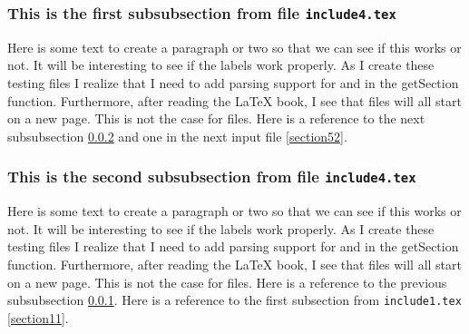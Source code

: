 \subsubsection{This is the first subsubsection from file \texttt{include4.tex}}
\label{section41}

Here is some text to create a paragraph or two so that we
can see if this works or not.  It will be interesting to see
if the labels work properly.  As I create these testing files
I realize that I need to add parsing support for \verb##
and \verb## in the getSection function.   Furthermore,
after reading the \LaTeX{} book, I see that \verb## 
files will all start on a new page.  This is not the case for
\verb## files.  Here is a reference to the next subsubsection \ref{section42} 
and one in the next input file \ref{section52}.

\subsubsection{This is the second subsubsection from file \texttt{include4.tex}}
\label{section42}

Here is some text to create a paragraph or two so that we
can see if this works or not.  It will be interesting to see
if the labels work properly.  As I create these testing files
I realize that I need to add parsing support for \verb##
and \verb## in the getSection function.   Furthermore,
after reading the \LaTeX{} book, I see that \verb## 
files will all start on a new page.  This is not the case for
\verb## files.  Here is a reference to the previous subsubsection \ref{section41}.
Here is a reference to the first subsection from \texttt{include1.tex}
\ref{section11}.
